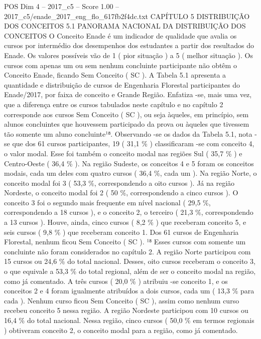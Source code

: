 \begin{textsample}{POS Dim 4 – 2017\_c5 – Score 1.00 – 2017\_c5/enade\_2017\_eng\_flo\_617fb2f4dc.txt}  \label{ex:f4_pos_227}
CAPÍTULO 5 DISTRIBUIÇÃO DOS CONCEITOS 5.1 PANORAMA NACIONAL DA DISTRIBUIÇÃO DOS CONCEITOS O Conceito Enade é um indicador de qualidade que avalia os cursos por intermédio dos desempenhos dos estudantes a partir dos resultados do Enade.
Os valores possíveis vão de 1 ( pior situação ) a 5 ( melhor situação ).
Os cursos com apenas um ou sem nenhum concluinte participante não obtêm o Conceito Enade, ficando Sem Conceito ( SC ).
A Tabela 5.1 apresenta a quantidade e distribuição de cursos de Engenharia Florestal participantes do Enade/2017, por faixa de conceito e Grande Região.
Enfatiza -se, mais uma vez, que a diferença entre os cursos tabulados neste capítulo e no capítulo 2 corresponde aos cursos Sem Conceito ( SC ), ou seja àqueles, em princípio, sem alunos concluintes que houvessem participado da prova ou àqueles que tivessem tão somente um aluno concluinte¹⁸.
Observando -se os dados da Tabela 5.1, nota -se que dos 61 cursos participantes, 19 ( 31,1 \% ) classificaram -se com conceito 4, o valor modal.
Esse foi também o conceito modal nas regiões Sul ( 35,7 \% ) e Centro-Oeste ( 36,4 \% ).
Na região Sudeste, os conceitos 4 e 5 foram os conceitos modais, cada um deles com quatro cursos ( 36,4 \%, cada um ).
Na região Norte, o conceito modal foi 3 ( 53,3 \%, correspondendo a oito cursos ).
Já na região Nordeste, o conceito modal foi 2 ( 50 \%, correspondendo a cinco cursos ).
O conceito 3 foi o segundo mais frequente em nível nacional ( 29,5 \%, correspondendo a 18 cursos ), e o conceito 2, o terceiro ( 21,3 \%, correspondendo a 13 cursos ).
Houve, ainda, cinco cursos ( 8,2 \% ) que receberam conceito 5, e seis cursos ( 9,8 \% ) que receberam conceito 1.
Dos 61 cursos de Engenharia Florestal, nenhum ficou Sem Conceito ( SC ). ¹⁸ Esses cursos com somente um concluinte não foram considerados no capítulo 2.
A região Norte participou com 15 cursos ou 24,6 \% do total nacional.
Desses, oito cursos receberam o conceito 3, o que equivale a 53,3 \% do total regional, além de ser o conceito modal na região, como já comentado.
A três cursos ( 20,0 \% ) atribuiu -se conceito 1, e os conceitos 2 e 4 foram igualmente atribuídos a dois cursos, cada um ( 13,3 \% para cada ).
Nenhum curso ficou Sem Conceito ( SC ), assim como nenhum curso recebeu conceito 5 nessa região.
A região Nordeste participou com 10 cursos ou 16,4 \% do total nacional.
Nessa região, cinco cursos ( 50,0 \% em termos regionais ) obtiveram conceito 2, o conceito modal para a região, como já comentado.

\end{textsample}
